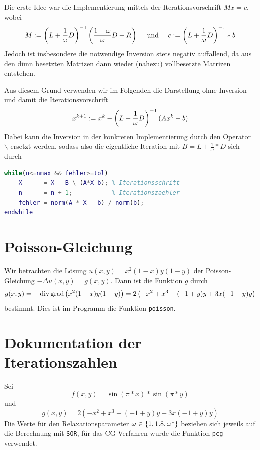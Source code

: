 \documentclass[ %
ngerman, %
a4paper, %
sectionreset, %
chapterstyle=framed, %
sectionstyle=dotted, %
titlefont=osfamily %
]{../../../../texmf/tex/latex/mathscriptMathTUD/mathscriptMathTUD}
\begin{document}
	Die erste Idee war die Implementierung mittels der Iterationsvorschrift $Mx = c$, wobei 
	\begin{equation*}
		M \mathrel{:=} \left( L + \frac{1}{\omega} D \right)^{-1} \left( \frac{1 - \omega}{\omega} D - R \right) \quad \text{ und } \quad c \mathrel{:=} \left( L + \frac{1}{\omega} D \right)^{-1} * b
	\end{equation*}
	Jedoch ist insbesondere die notwendige Inversion stets negativ auffallend, da aus den dünn besetzten Matrizen dann wieder (nahezu) vollbesetzte Matrizen entstehen.
	
	Aus diesem Grund verwenden wir im Folgenden die Darstellung ohne Inversion und damit die Iterationsvorschrift
	\begin{equation*}
		x^{k+1} \mathrel{:=} x^k - \left( L + \frac{1}{\omega}D \right)^{-1} (Ax^k - b)
	\end{equation*}
	Dabei kann die Inversion in der konkreten Implementierung durch den Operator \texttt{$\backslash$} ersetzt werden, sodass also die eigentliche Iteration mit $B = L + \frac{1}{\omega} * D$ sich durch
\begin{lstlisting}[language=matlab, ]
while(n<=nmax && fehler>=tol)
	X      = X - B \ (A*X-b); % Iterationsschritt
	n      = n + 1;           % Iterationszaehler
	fehler = norm(A * X - b) / norm(b);
endwhile
\end{lstlisting}

	
    \section{Poisson-Gleichung}
    Wir betrachten die Lösung $u(x,y) = x^2 (1-x) y (1-y)$  der Poisson-Gleichung $- \Delta u(x,y) = g(x,y)$. Dann ist die Funktion $g$ durch 
    \begin{equation*}
    	g(x,y) = -\operatorname{div} \operatorname{grad} \left( x^2 (1-x) y (1-y) \right) = 2 \left( -x^2 + x^3 - (-1 + y) y + 3 x (-1 + y) y \right)
    \end{equation*}
    bestimmt. Dies ist im Programm die Funktion \texttt{poisson}.
    
    \section{Dokumentation der Iterationszahlen}
    
    Sei
    \begin{equation*}
    	f(x,y) = \sin(\pi * x) * \sin(\pi * y)
    \end{equation*}
    und 
    \begin{equation*}
    	g(x,y) = 2 \left( -x^2 + x^3 - (-1 + y) y + 3 x (-1 + y) y \right)
    \end{equation*}
    Die Werte für den Relaxationsparameter $\omega \in \left\{ 1, 1.8, \omega^\ast \right\}$ beziehen sich jeweils auf die Berechnung mit \texttt{SOR}, für das CG-Verfahren wurde die Funktion \texttt{pcg} verwendet.
    
\end{document}
